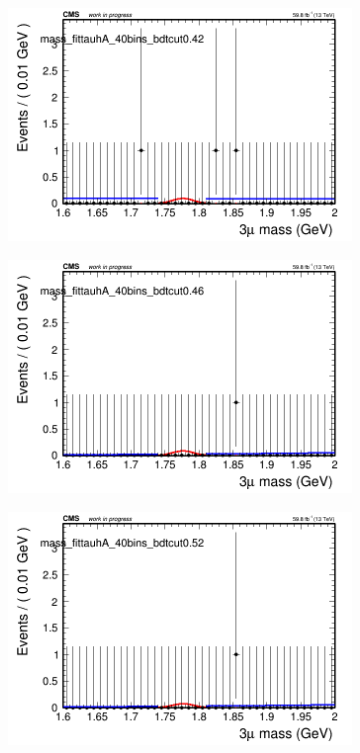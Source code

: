 \begin{figure}[H]
\begin{subfigure}{0.2\textwidth}
        \includegraphics[width=\textwidth]{unfixed_exp/plots/tauhA/massfit_tauhA_40bins_bdtcut0.42.png}
        \caption{}
    \end{subfigure}
    \begin{subfigure}{0.2\textwidth}
        \includegraphics[width=\textwidth]{unfixed_exp/plots/tauhA/massfit_tauhA_40bins_bdtcut0.46.png}
        \caption{}
    \end{subfigure}
    \begin{subfigure}{0.2\textwidth}
        \includegraphics[width=\textwidth]{unfixed_exp/plots/tauhA/massfit_tauhA_40bins_bdtcut0.52.png}

\end{subfigure}
\end{figure}
